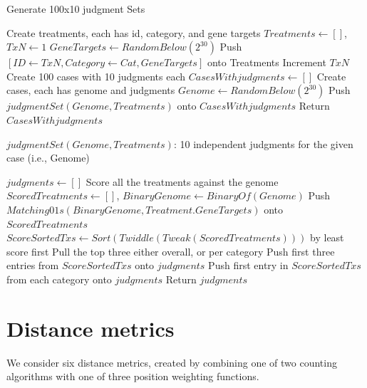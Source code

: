 \documentclass{article}
\begin{document}
\begin{algorithm}
	\caption{Generate 100x10 judgment Sets} 
	\begin{algorithmic}[1]
		\State Create treatments, each has id, category, and gene targets
	    \State $Treatments\leftarrow []$, $TxN\leftarrow 1$
		        \State $GeneTargets\leftarrow RandomBelow(2^{30})$
		        \State Push $[ID\leftarrow TxN, Category\leftarrow Cat, GeneTargets]$ onto Treatments
		        \State Increment $TxN$
		    \EndFor
		\EndFor
		\State Create 100 cases with 10 judgments each
	    \State $CasesWithjudgments\leftarrow []$
	    	\State Create cases, each has genome and judgments
	    	\State $Genome\leftarrow RandomBelow(2^{30})$
    	    \State Push $judgmentSet(Genome,Treatments)$ onto $CasesWithjudgments$
		\EndFor
	\State Return $CasesWithjudgments$
	\end{algorithmic} 
\end{algorithm}

\begin{algorithm}
	\caption{$judgmentSet(Genome,Treatments)$: 10 independent judgments for the given case (i.e., Genome)}
	\begin{algorithmic}[1]
		\State $judgments \leftarrow []$
		\State Score all the treatments against the genome
		\State $ScoredTreatments \leftarrow []$, $BinaryGenome  \leftarrow BinaryOf(Genome)$
		    \State Push $Matching01s(BinaryGenome,Treatment.GeneTargets)$ onto $ScoredTreatments$  
		\EndFor
		    \State $ScoreSortedTxs \leftarrow Sort(Twiddle(Tweak(ScoredTreatments)))$ by least score first
		    \State Pull the top three either overall, or per category
		        \State Push first three entries from $ScoreSortedTxs$ onto $judgments$
		    \Else
		        \State Push first entry in $ScoreSortedTxs$ from each category onto $judgments$
		    \EndIf
		\EndFor
		\State Return $judgments$
	\end{algorithmic} 
\end{algorithm} 

\newpage
\section{Distance metrics}

We consider six distance metrics, created by combining one of two counting algorithms with one of three position weighting functions.  
\end{document}
